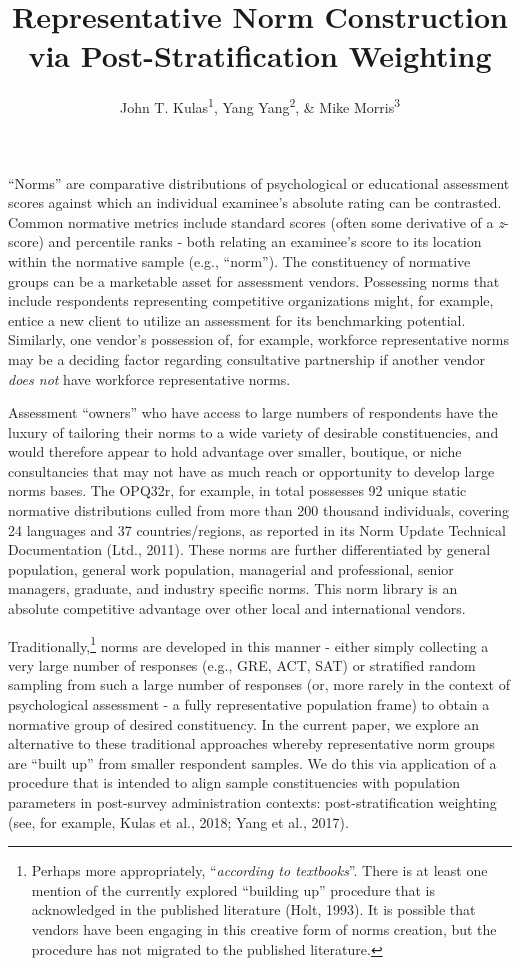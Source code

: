 \documentclass[
  ,man]{apa7}
\title{Representative Norm Construction via Post-Stratification Weighting}
\author{John T. Kulas\textsuperscript{1}, Yang Yang\textsuperscript{2}, \& Mike Morris\textsuperscript{3}}
\date{}
\affiliation{\vspace{0.5cm}\textsuperscript{1} Montclair State University\\\textsuperscript{2} China Select\\\textsuperscript{3} CPP Inc}
\begin{document}
\maketitle

``Norms'' are comparative distributions of psychological or educational assessment scores against which an individual examinee's absolute rating can be contrasted. Common normative metrics include standard scores (often some derivative of a \emph{z}-score) and percentile ranks - both relating an examinee's score to its location within the normative sample (e.g., ``norm''). The constituency of normative groups can be a marketable asset for assessment vendors. Possessing norms that include respondents representing competitive organizations might, for example, entice a new client to utilize an assessment for its benchmarking potential. Similarly, one vendor's possession of, for example, workforce representative norms may be a deciding factor regarding consultative partnership if another vendor \emph{does not} have workforce representative norms.

Assessment ``owners'' who have access to large numbers of respondents have the luxury of tailoring their norms to a wide variety of desirable constituencies, and would therefore appear to hold advantage over smaller, boutique, or niche consultancies that may not have as much reach or opportunity to develop large norms bases. The OPQ32r, for example, in total possesses 92 unique static normative distributions culled from more than 200 thousand individuals, covering 24 languages and 37 countries/regions, as reported in its Norm Update Technical Documentation (Ltd., 2011). These norms are further differentiated by general population, general work population, managerial and professional, senior managers, graduate, and industry specific norms. This norm library is an absolute competitive advantage over other local and international vendors.

Traditionally,\footnote{Perhaps more appropriately, ``\emph{according to textbooks}''. There is at least one mention of the currently explored ``building up'' procedure that is acknowledged in the published literature (Holt, 1993). It is possible that vendors have been engaging in this creative form of norms creation, but the procedure has not migrated to the published literature.} norms are developed in this manner - either simply collecting a very large number of responses (e.g., GRE, ACT, SAT) or stratified random sampling from such a large number of responses (or, more rarely in the context of psychological assessment - a fully representative population frame) to obtain a normative group of desired constituency. In the current paper, we explore an alternative to these traditional approaches whereby representative norm groups are ``built up'' from smaller respondent samples. We do this via application of a procedure that is intended to align sample constituencies with population parameters in post-survey administration contexts: post-stratification weighting (see, for example, Kulas et al., 2018; Yang et al., 2017).
\end{document}

